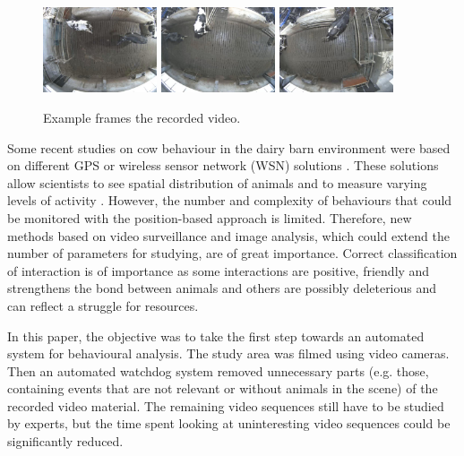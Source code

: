 \documentclass{cta-author}
\begin{document}
\begin{figure}[b]
\begin{center}
  \includegraphics[width=0.3\textwidth]{old-2.jpg}
  \includegraphics[width=0.3\textwidth]{old-1.jpg}
  \includegraphics[width=0.3\textwidth]{old-0.jpg}
\end{center}
  \caption{Example frames the recorded video.}
  \label{fig:old}
\end{figure}


Some recent studies on cow behaviour in the dairy barn environment were based on different GPS or wireless
sensor network (WSN) solutions \cite{Nadimietal2012}. These solutions allow scientists to see spatial
distribution of animals and to measure varying levels of activity \cite{Nadimietal2012}. However, the number
and complexity of behaviours that could be monitored with the position-based approach is limited. Therefore,
new methods based on video surveillance and image analysis, which could extend the number of parameters for
studying, are of great importance. Correct classification of interaction is of importance as some
interactions are positive, friendly and strengthens the bond between animals and others are possibly
deleterious and can reflect a struggle for resources.

In this paper, the objective was to take the first step towards an automated system for behavioural analysis.
The study area was filmed using video cameras. Then an automated watchdog system removed unnecessary parts
(e.g. those, containing events that are not relevant or without animals in the scene) of the recorded video
material. The remaining video sequences still have to be studied by experts, but the time spent
looking at uninteresting video sequences could be significantly reduced.
\end{document}
